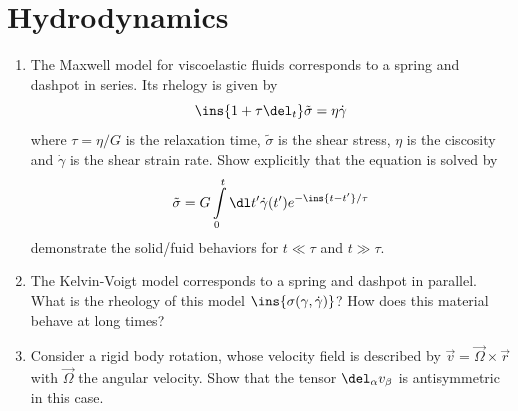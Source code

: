 \clearpage
\section{Hydrodynamics}
\begin{colbox}
	\begin{enumerate}
		\item The Maxwell model for viscoelastic fluids corresponds to a spring and dashpot in series. Its rhelogy is given by \begin{equation}
			\ins{1+\tau\del_t}\tilde{\sigma}=\eta\dot{\gamma}
		\end{equation}
		where \(\tau = \eta / G\) is the relaxation time, \(\tilde{\sigma}\) is the shear stress, \(\eta\) is the ciscosity and \(\dot{\gamma}\) is the shear strain rate. Show explicitly that the equation is solved by \begin{equation}
			\tilde{\sigma} = G\int\limits_0^t \dl t' \dot{\gamma}(t') e^{-\ins{t-t'}/\tau}
		\end{equation}
		demonstrate the solid/fuid behaviors for \(t\ll\tau\) and \(t\gg\tau\).
		\item The Kelvin-Voigt model corresponds to a spring and dashpot in parallel. What is the rheology of this model \(\ins{\sigma(\gamma,\dot{\gamma})}\)? How does this material behave at long times?
		\item Consider a rigid body rotation, whose velocity field is described by \(\vec{v} = \vec{\Omega}\times\vec{r}\) with \(\vec{\Omega}\) the angular velocity. Show that the tensor \(\del_\alpha v_\beta\) is antisymmetric in this case.
	\end{enumerate}
\end{colbox}
